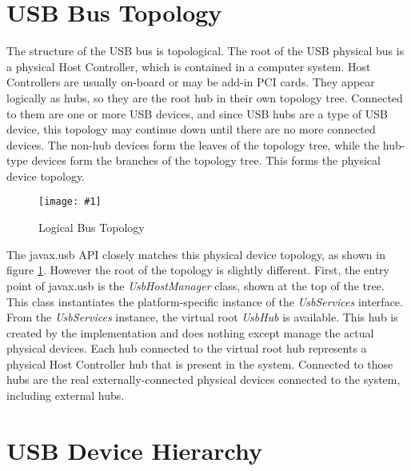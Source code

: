 \documentclass{article}
\newcommand{\myclass}[1]{\emph{#1}}
\newcommand{\myinterface}[1]{\emph{#1}}
\newcommand{\mysectionend}[0]{\vfill\pagebreak[1]}
\newcommand{\myfigure}[3]{\begin{figure}[htbp]\centering\texttt{[image: \#1]}\caption{#2}\label{#3}\end{figure}}
\begin{document}
%

\section{USB Bus Topology}

The structure of the USB bus is topological.  The root
of the USB physical bus is a physical Host Controller, which is contained
in a computer system.  Host Controllers are usually on-board or may be
add-in PCI cards.  They appear logically as hubs, so they are the root hub
in their own topology tree.  Connected to them are one or more USB devices,
and since USB hubs are a type of USB device, this topology may continue
down until there are no more connected devices.  The non-hub devices form
the leaves of the topology tree, while the hub-type devices form the branches
of the topology tree.  This forms the physical device topology.

\myfigure{figs/logical_bus_topology}{Logical Bus Topology}{bus_topology}

The javax.usb API closely matches this physical device topology, as shown in
figure \ref{bus_topology}.  However the root of the topology is slightly different.
First, the entry point of javax.usb is the \myclass{UsbHostManager} class, shown at the
top of the tree.  This class instantiates the platform-specific instance of
the \myinterface{UsbServices} interface.  From the \myinterface{UsbServices} instance, the virtual root
\myinterface{UsbHub} is available.  This hub is created by the implementation and does
nothing except manage the actual physical devices.  Each hub connected to
the virtual root hub represents a physical Host Controller hub that is
present in the system.  Connected to those hubs are the real externally-connected
physical devices connected to the system, including external hubs.

\mysectionend


\section{USB Device Hierarchy}
\end{document}
